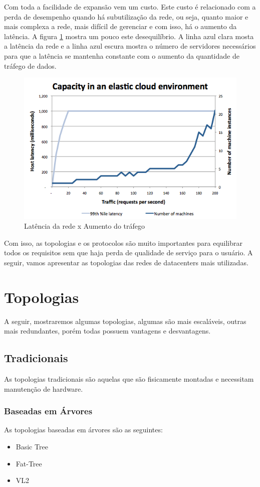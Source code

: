 \documentclass[12pt,a4paper]{report}
\begin{document}
Com toda a facilidade de expansão vem um custo. Este custo é relacionado com a perda de desempenho quando há subutilização da rede, ou seja, quanto maior e mais complexa a rede, mais difícil de gerenciar e com isso, há o aumento da latência. A figura \ref{capacity} mostra um pouco este desequilíbrio. A linha azul clara mosta a latência da rede e a linha azul escura mostra o número de servidores necessários para que a latência se mantenha constante com o aumento da quantidade de tráfego de dados.\\

\begin{figure}[H]
\centering
\includegraphics[width=.7\textwidth]{imagens/capacity.png}
\caption{Latência da rede x Aumento do tráfego}
\label{capacity}
\end{figure}

Com isso, as topologias e os protocolos são muito importantes para equilibrar todos os requisitos sem que haja perda de qualidade de serviço para o usuário. A seguir, vamos apresentar as topologias das redes de datacenters mais utilizadas.\\

\chapter{Topologias}
A seguir, mostraremos algumas topologias, algumas são mais escaláveis, outras mais redundantes, porém todas possuem vantagens e desvantagens.\\

\section{Tradicionais}
As topologias tradicionais são aquelas que são fisicamente montadas e necessitam manutenção de hardware.\\

\subsection{Baseadas em Árvores}
As topologias baseadas em árvores são as seguintes:\\
\begin{itemize}
\item Basic Tree
\item Fat-Tree
\item VL2 
\end{itemize}
\end{document}
